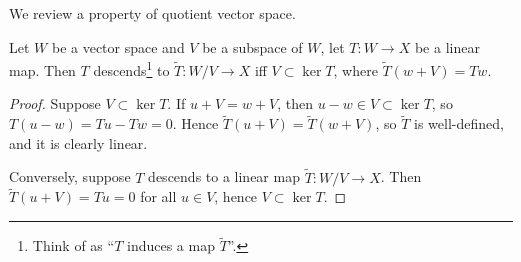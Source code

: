 We review a property of quotient vector space.
\begin{lemma}
    Let $W$ be a vector space and $V$ be a subspace of $W$, let $T:W \to X$ be a linear map. Then $T$ descends\footnote{Think of as ``$T$ induces a map $\widetilde{T}$''. } 
    to $\widetilde{T}:W / V \to X$ iff $V \subset \ker T$, where $\widetilde{T}(w+V) = Tw$. 
\end{lemma}
\begin{proof}
    Suppose $V \subset \ker T$. If $u+V = w+V$, then $u-w \in V \subset \ker T$, so $T(u-w) = Tu - Tw = 0$. Hence $\widetilde{T}(u+V) = \widetilde{T}(w+V)$, so $\widetilde{T}$ is well-defined, and it is clearly linear. 

    Conversely, suppose $T$ descends to a linear map $\widetilde{T}:W/V \to X$. Then $\widetilde{T}(u+V) = Tu = 0$ for all $u \in V$, hence $V \subset \ker T$.  
\end{proof}

